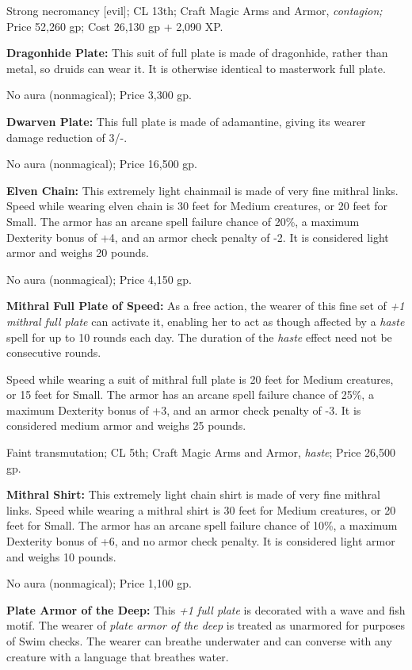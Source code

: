 Strong necromancy [evil]; CL 13th; Craft Magic Arms and Armor, \textit{contagion; 
}Price 52,260 gp; Cost 26,130 gp + 2,090 XP.

\textbf{Dragonhide Plate:} This suit of full plate is made of dragonhide, rather 
than metal, so druids can wear it. It is otherwise identical to masterwork full 
plate.

No aura (nonmagical); Price 3,300 gp.

\textbf{Dwarven Plate:} This full plate is made of adamantine, giving its wearer 
damage reduction of 3/-.

No aura (nonmagical); Price 16,500 gp.

\textbf{Elven Chain:} This extremely light chainmail is made of very fine mithral 
links. Speed while wearing elven chain is 30 feet for Medium creatures, or 20 feet 
for Small. The armor has an arcane spell failure chance of 20\%, a maximum Dexterity 
bonus of +4, and an armor check penalty of -2. It is considered light armor and 
weighs 20 pounds.

No aura (nonmagical); Price 4,150 gp.

\textbf{Mithral Full Plate of Speed:} As a free action, the wearer of this fine 
set of \textit{+1 mithral full plate }can activate it, enabling her to act as though 
affected by a \textit{haste }spell for up to 10 rounds each day. The duration of 
the \textit{haste }effect need not be consecutive rounds.

Speed while wearing a suit of mithral full plate is 20 feet for Medium creatures, 
or 15 feet for Small. The armor has an arcane spell failure chance of 25\%, a maximum 
Dexterity bonus of +3, and an armor check penalty of -3. It is considered medium 
armor and weighs 25 pounds.

Faint transmutation; CL 5th; Craft Magic Arms and Armor, \textit{haste}; Price 
26,500 gp.

\textbf{Mithral Shirt:} This extremely light chain shirt is made of very fine mithral 
links. Speed while wearing a mithral shirt is 30 feet for Medium creatures, or 
20 feet for Small. The armor has an arcane spell failure chance of 10\%, a maximum 
Dexterity bonus of +6, and no armor check penalty. It is considered light armor 
and weighs 10 pounds.

No aura (nonmagical); Price 1,100 gp.

\textbf{Plate Armor of the Deep: }This \textit{+1 full plate }is decorated with 
a wave and fish motif. The wearer of \textit{plate armor of the deep }is treated 
as unarmored for purposes of Swim checks. The wearer can breathe underwater and 
can converse with any creature with a language that breathes water.


